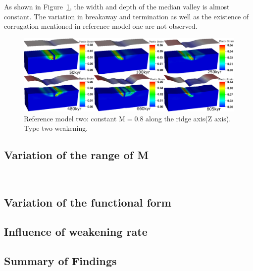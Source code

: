 As shown in Figure~\ref{fig_Results1_3}, the width and depth of the median valley is almost constant. The variation in breakaway and termination as well as the existence of corrugation mentioned in reference model one are not observed. 
\begin{figure}[H]
  \centering
    \includegraphics[width=1.0\textwidth]{fig_Results1_3.eps}
  \caption{Reference model two: constant M$=0.8$ along the ridge axis(Z axis). Type two weakening.}
 \label{fig_Results1_3}
\end{figure}   


\subsection{Variation of the range of M}

\


\subsection{Variation of the functional form}

\subsection{Influence of weakening rate}

\subsection{Summary of Findings}
